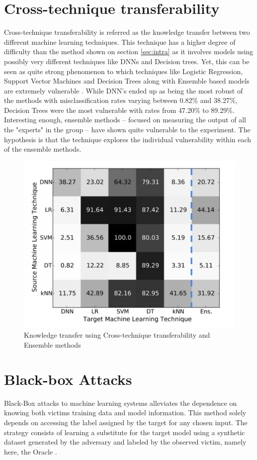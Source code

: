 \section{Cross-technique transferability}
Cross-technique transferability is referred as the knowledge transfer between two different machine learning techniques. This technique has a higher degree of difficulty than the method shown on section \ref{sec:intra} as it involves models using possibly very different techniques like DNNs and Decision trees. Yet, this can be seen as quite strong phenomenon to which techniques like Logistic Regression, Support Vector Machines and Decision Trees along with Ensemble based models are extremely vulnerable \cite{papernot2016transf}. While DNN's ended up as being the most robust of the methods with misclassification rates varying between 0.82\% and 38.27\%, Decision Trees were the most vulnerable with rates from 47.20\% to 89.29\%. Interesting enough, ensemble methods -- focused on measuring the output of all the "experts" in the group -- have shown quite vulnerable to the experiment. The hypothesis is that the technique explores the individual vulnerability within each of the ensemble methods.

\begin{figure}[!h]
	\centering
	\includegraphics[scale=0.6]{cross.png}
	\caption{Knowledge transfer using Cross-technique transferability and Ensemble methods \cite{papernot2016transf}}
	\label{fig:cross}
\end{figure}
\section{Black-box Attacks}
Black-Box attacks to machine learning systems alleviates the dependence on knowing both victims training data and model information. This method solely depends on accessing the label assigned by the target for any chosen input. The strategy consists of learning a substitute for the target model using a synthetic dataset generated by the adversary and labeled by the observed victim, namely here, the Oracle \cite{papernot2016}.

